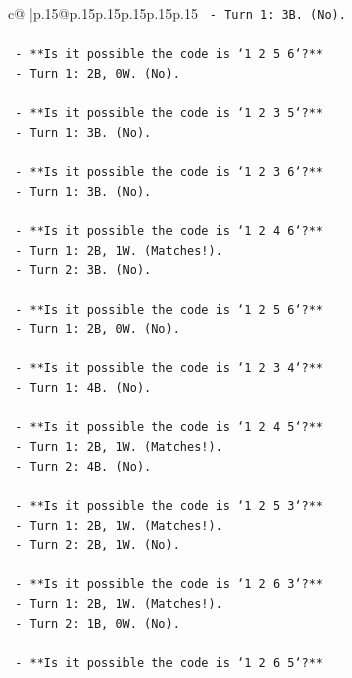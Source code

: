 \documentclass{article}
\begin{document}
{\begin{supertabular}{c@{$\;$}|p{.15\linewidth}@{}p{.15\linewidth}p{.15\linewidth}p{.15\linewidth}p{.15\linewidth}p{.15\linewidth}}
{{{\texttt{        {-} Turn 1: 3B. (No).} \\
\\ 
\texttt{    {-} **Is it possible the code is `1 2 5 6`?**} \\
\texttt{        {-} Turn 1: 2B, 0W. (No).} \\
\\ 
\texttt{    {-} **Is it possible the code is `1 2 3 5`?**} \\
\texttt{        {-} Turn 1: 3B. (No).} \\
\\ 
\texttt{    {-} **Is it possible the code is `1 2 3 6`?**} \\
\texttt{        {-} Turn 1: 3B. (No).} \\
\\ 
\texttt{    {-} **Is it possible the code is `1 2 4 6`?**} \\
\texttt{        {-} Turn 1: 2B, 1W. (Matches!).} \\
\texttt{        {-} Turn 2: 3B. (No).} \\
\\ 
\texttt{    {-} **Is it possible the code is `1 2 5 6`?**} \\
\texttt{        {-} Turn 1: 2B, 0W. (No).} \\
\\ 
\texttt{    {-} **Is it possible the code is `1 2 3 4`?**} \\
\texttt{        {-} Turn 1: 4B. (No).} \\
\\ 
\texttt{    {-} **Is it possible the code is `1 2 4 5`?**} \\
\texttt{        {-} Turn 1: 2B, 1W. (Matches!).} \\
\texttt{        {-} Turn 2: 4B. (No).} \\
\\ 
\texttt{    {-} **Is it possible the code is `1 2 5 3`?**} \\
\texttt{        {-} Turn 1: 2B, 1W. (Matches!).} \\
\texttt{        {-} Turn 2: 2B, 1W. (No).} \\
\\ 
\texttt{    {-} **Is it possible the code is `1 2 6 3`?**} \\
\texttt{        {-} Turn 1: 2B, 1W. (Matches!).} \\
\texttt{        {-} Turn 2: 1B, 0W. (No).} \\
\\ 
\texttt{    {-} **Is it possible the code is `1 2 6 5`?**} \\
}}}
\end{supertabular}}
\end{document}
